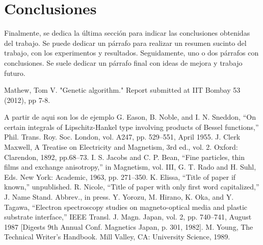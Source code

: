 \documentclass[conference,a4paper]{IEEEtran}
\begin{document}
\section{Conclusiones}

Finalmente, se dedica la última sección para indicar las conclusiones obtenidas
del trabajo. Se puede dedicar un párrafo para realizar un resumen sucinto del
trabajo, con los experimentos y resultados. Seguidamente, uno o dos párrafos
con conclusiones. Se suele dedicar un párrafo final con ideas de mejora y
trabajo futuro.


\begin{thebibliography}{00}
Mathew, Tom V. "Genetic algorithm." Report submitted at IIT Bombay 53 (2012), pp 7-8.


A partir de aqui son los de ejemplo
 G. Eason, B. Noble, and I. N. Sneddon, ``On certain integrals of Lipschitz-Hankel type involving products of Bessel functions,'' Phil. Trans. Roy. Soc. London, vol. A247, pp. 529--551, April 1955.
 J. Clerk Maxwell, A Treatise on Electricity and Magnetism, 3rd ed., vol. 2. Oxford: Clarendon, 1892, pp.68--73.
 I. S. Jacobs and C. P. Bean, ``Fine particles, thin films and exchange anisotropy,'' in Magnetism, vol. III, G. T. Rado and H. Suhl, Eds. New York: Academic, 1963, pp. 271--350.
 K. Elissa, ``Title of paper if known,'' unpublished.
 R. Nicole, ``Title of paper with only first word capitalized,'' J. Name Stand. Abbrev., in press.
 Y. Yorozu, M. Hirano, K. Oka, and Y. Tagawa, ``Electron spectroscopy studies on magneto-optical media and plastic substrate interface,'' IEEE Transl. J. Magn. Japan, vol. 2, pp. 740--741, August 1987 [Digests 9th Annual Conf. Magnetics Japan, p. 301, 1982].
 M. Young, The Technical Writer's Handbook. Mill Valley, CA: University Science, 1989.
\end{thebibliography}
\end{document}
